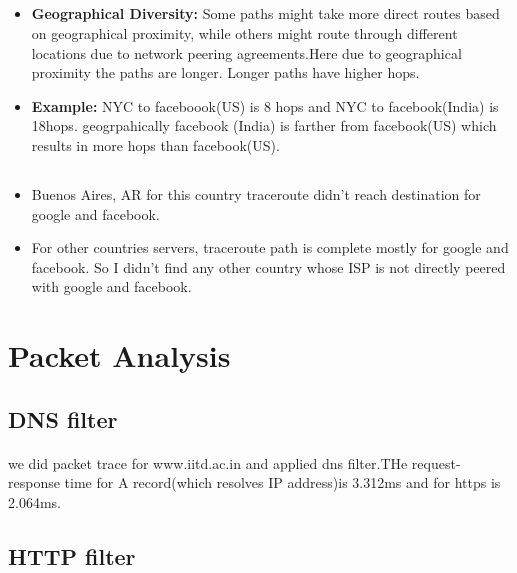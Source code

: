 \documentclass{article}
\begin{document}
\subsection{}
\begin{itemize}
    \item \textbf{Geographical Diversity:} Some paths might take more direct routes based on geographical proximity, while others might route through different locations due to network peering agreements.Here due to geographical proximity the paths are longer. Longer paths have higher hops.
    \item\textbf{Example:} NYC to faceboook(US) is 8 hops and NYC to facebook(India) is 18hops. geogrpahically facebook (India) is farther from facebook(US) which results in more hops than facebook(US).
\end{itemize}
\subsection{}
\begin{itemize}
    \item Buenos Aires, AR for this country traceroute didn't reach destination for google and facebook.
    \item For other countries servers, traceroute path is complete mostly for google and facebook. So I didn't find any other country whose ISP is not directly peered with google and facebook.
\end{itemize}

\section{Packet Analysis}
\subsection{DNS filter}
\paragraph{} we did packet trace for www.iitd.ac.in and applied dns filter.THe request-response time for A record(which resolves IP address)is 3.312ms and for https is 2.064ms.
\subsection{HTTP filter}
\end{document}
